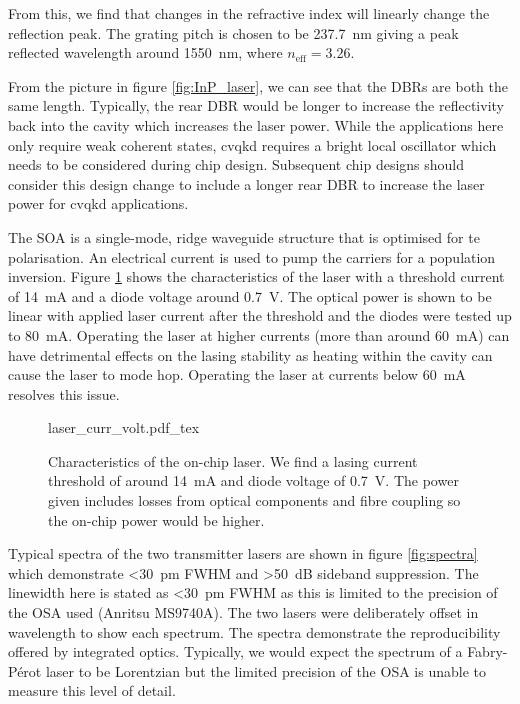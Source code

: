 From this, we find that changes in the refractive index will linearly change the reflection peak. The grating pitch is chosen to be \SI{237.7}{nm} giving a peak reflected wavelength around \SI{1550}{nm}, where $n_\text{eff} = 3.26$.

From the picture in figure \ref{fig:InP_laser}, we can see that the \acp{DBR} are both the same length. Typically, the rear \ac{DBR} would be longer to increase the reflectivity back into the cavity which increases the laser power. While the applications here only require weak coherent states, \ac{cvqkd} \cite{Ralph1999} requires a bright local oscillator which needs to be considered during chip design. Subsequent chip designs should consider this design change to include a longer rear \ac{DBR} to increase the laser power for \ac{cvqkd} applications.

The \ac{SOA} is a single-mode, ridge waveguide structure that is optimised for \ac{te} polarisation. An electrical current is used to pump the carriers for a population inversion. Figure \ref{fig:las_curr_volt} shows the characteristics of the laser with a threshold current of \SI{14}{\mA} and a diode voltage around \SI{0.7}{V}. The optical power is shown to be linear with applied laser current after the threshold and the diodes were tested up to \SI{80}{\mA}. Operating the laser at higher currents (more than around \SI{60}{\mA}) can have detrimental effects on the lasing stability as heating within the cavity can cause the laser to mode hop. Operating the laser at currents below \SI{60}{mA} resolves this issue.

\begin{figure}[t]
	\centering
	\tiny
	\def\svgwidth{\textwidth} 
	{laser_curr_volt.pdf_tex}
	\caption[Lasing current threshold and voltage]{Characteristics of the on-chip laser. We find a lasing current threshold of around \SI{14}{mA} and diode voltage of \SI{0.7}{V}. The power given includes losses from optical components and fibre coupling so the on-chip power would be higher.}
	\label{fig:las_curr_volt}
\end{figure}


Typical spectra of the two transmitter lasers are shown in figure \ref{fig:spectra} which demonstrate \SI{<30}{pm} \ac{FWHM} and \SI{>50}{dB} sideband suppression. The linewidth here is stated as \SI{<30}{pm} \ac{FWHM} as this is limited to the precision of the \ac{OSA} used (Anritsu MS9740A). The two lasers were deliberately offset in wavelength to show each spectrum. The spectra demonstrate the reproducibility offered by integrated optics. Typically, we would expect the spectrum of a Fabry-P\'{e}rot laser to be Lorentzian \cite{Ismail16} but the limited precision of the \ac{OSA} is unable to measure this level of detail. 

